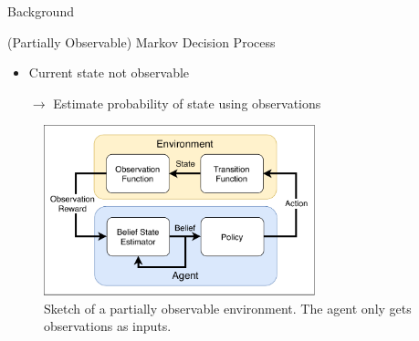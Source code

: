 \begin{exampleblock}{Background}
\begin{figure}[htp]
\end{figure}


\Large{(Partially Observable) Markov Decision Process}

\normalsize
\begin{itemize}
    \item Current state not observable
    \item[$\rightarrow$] Estimate probability of state using observations
\end{itemize}

\hspace{2cm}


\begin{figure}
  \centering
    \includegraphics[width=0.7\textwidth]{img/background/POMDP}
  \caption{Sketch of a partially observable environment. The agent only gets observations as inputs.}
\end{figure}






\end{exampleblock}
